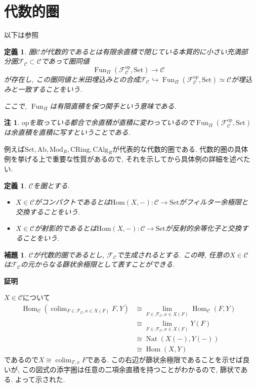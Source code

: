 \documentclass{ltjsarticle}
\makeatletter
\theoremstyle{mystyle}
\newtheorem{dfn}[theorem]{定義}
\newtheorem{lemma}[theorem]{補題}
\newtheorem{rmk}[theorem]{注}
\renewcommand{\proofname}{\textbf{証明}}
\renewenvironment{proof}[1][\proofname]{\par
  \pushQED{\qed}
  \normalfont \topsep6\p@\@plus6\p@\relax
  \trivlist
  \item\relax
  {#1\@addpunct{\newline\ignorespaces}}%
}{
  \popQED\endtrivlist\@endpefalse
}
\DeclareMathOperator{\Hom}{Hom}
\DeclareMathOperator{\colim}{colim}
\makeatother
\begin{document}
\section{代数的圏}
以下は\cite{AlgStk}参照
\begin{dfn}
  圏$\mathcal C$が代数的であるとは有限余直積で閉じている本質的に小さい充満部分圏$\mathcal F_{\mathcal C}\subset\mathcal C$であって圏同値
  \[\operatorname{Fun}_{\Pi}(\mathcal F_{\mathcal C}^{\mathrm{op}},\mathrm{Set})\to\mathcal C\]
  が存在し, この圏同値と米田埋込みとの合成$\mathcal F_{\mathcal C}\hookrightarrow\operatorname{Fun}_{\Pi}(\mathcal F_{\mathcal C}^{\mathrm{op}},\mathrm{Set})\simeq\mathcal C$が埋込みと一致することをいう.

  ここで, $\operatorname{Fun}_{\Pi}$は有限直積を保つ関手という意味である.
\end{dfn}
\begin{rmk}
  $\mathrm{op}$を取っている都合で余直積が直積に変わっているので$\operatorname{Fun}_{\Pi}(\mathcal F_{\mathcal C}^{\mathrm{op}},\mathrm{Set})$は余直積を直積に写すということである.
\end{rmk}
例えば$\mathrm{Set},\mathrm{Ab},\mathrm{Mod}_R,\mathrm{CRing},\mathrm{CAlg}_R$が代表的な代数的圏である.
代数的圏の具体例を挙げる上で重要な性質があるので, それを示してから具体例の詳細を述べたい.
\begin{dfn}
  $\mathcal C$を圏とする.
  \begin{itemize}
    \item $X\in\mathcal C$がコンパクトであるとは$\mathrm{Hom}(X,-):\mathcal{C}\to\mathrm{Set}$がフィルター余極限と交換することをいう.
    \item $X\in\mathcal C$が射影的であるとは$\mathrm{Hom}(X,-):\mathcal{C}\to\mathrm{Set}$が反射的余等化子と交換することをいう.
  \end{itemize}
\end{dfn}
\begin{lemma}
  $\mathcal C$が代数的圏であるとし, $\mathcal F_{\mathcal C}$で生成されるとする.
  この時, 任意の$X\in\mathcal C$は$\mathcal F_{\mathcal C}$の元からなる篩状余極限として表すことができる.
\end{lemma}
\begin{proof}
  $X\in\mathcal C$について
  \begin{align*}
    \Hom_{\mathcal C}(\colim_{F\in\mathcal F_{\mathcal C},x\in X(F)}F,Y)&\cong\lim_{F\in\mathcal F_{\mathcal C},x\in X(F)}\Hom_{\mathcal C}(F,Y)\\
    &\cong\lim_{F\in\mathcal F_{\mathcal C},x\in X(F)}Y(F)\\
    &\cong\operatorname{Nat}(X(-),Y(-))\\
    &\cong\Hom(X,Y)
  \end{align*}
  であるので$X\cong\colim_{F,x}F$である. この右辺が篩状余極限であることを示せば良いが, この図式の添字圏は任意の二項余直積を持つことがわかるので, 篩状である.
  よって示された.
\end{proof}
\end{document}
